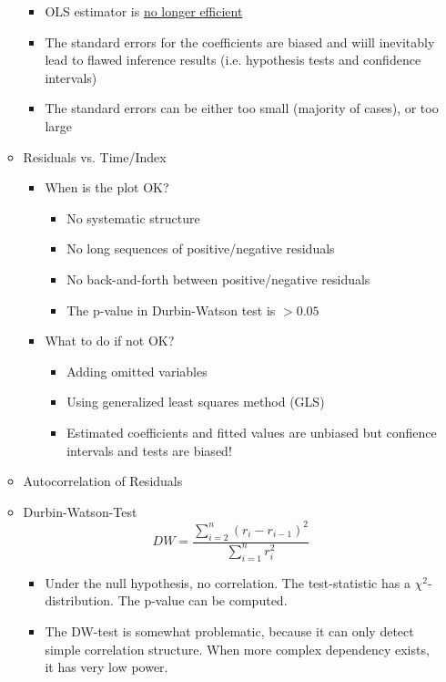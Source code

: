 \documentclass[a4paper]{article}
\begin{document}
\begin{itemize}
\begin{itemize}
\begin{itemize}
            \item OLS estimator is \underline{no longer efficient}
            \item The standard errors for the coefficients are biased and wiill inevitably lead to flawed inference results (i.e. hypothesis tests and confidence intervals)
            \item The standard errors can be either too small (majority of cases), or too large
        \end{itemize}
        \item Residuals vs. Time/Index
        \begin{itemize}
            \item When is the plot OK?
            \begin{itemize}
                \item No systematic structure
                \item No long sequences of positive/negative residuals
                \item No back-and-forth between positive/negative residuals
                \item The p-value in Durbin-Watson test is $>0.05$
            \end{itemize}
            \item What to do if not OK?
            \begin{itemize}
                \item Adding omitted variables
                \item Using generalized least squares method (GLS)
                \item Estimated coefficients and fitted values are unbiased but confience intervals and tests are biased!
            \end{itemize}
        \end{itemize}
        \item Autocorrelation of Residuals
        \item Durbin-Watson-Test
        \[DW=\frac{\sum_{i=2}^n(r_i-r_{i-1})^2}{\sum_{i=1}^nr_i^2} \]
        \begin{itemize}
            \item Under the null hypothesis, no correlation. The test-statistic has a $\chi^2$-distribution. The p-value can be computed.
            \item The DW-test is somewhat problematic, because it can only detect simple correlation structure. When more complex dependency exists, it has very low power.

\end{itemize}
\end{itemize}
\end{itemize}
\end{document}
